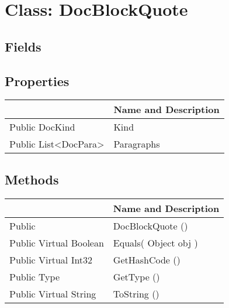 \documentclass[11pt, oneside, a4paper]{book}
\begin{document}
\hypertarget{SoftwareEngineeringTools.{}Documentation.{}DocBlockQuote}{}
\section{Class: DocBlockQuote}

\subsection{Fields}

\subsection{Properties}
\begin{center}
\begin{tabular}{| p{3cm} | p{12cm} | }
\hline
\textbf{ } & \textbf{ Name and Description}\\
\hline
 Public  DocKind &  Kind\hypertarget{SoftwareEngineeringTools.{}Documentation.{}DocBlockQuote.{}Kind}{}\\
\hline
 Public  List<DocPara> &  Paragraphs\hypertarget{SoftwareEngineeringTools.{}Documentation.{}DocBlockQuote.{}Paragraphs}{}\\
\hline
\end{tabular}
\end{center}

\subsection{Methods}
\begin{center}
\begin{tabular}{| p{3cm} | p{12cm} | }
\hline
\textbf{ } & \textbf{ Name and Description}\\
\hline
 Public  &  DocBlockQuote ()\hypertarget{SoftwareEngineeringTools.{}Documentation.{}DocBlockQuote.{}DocBlockQuote}{}\\
\hline
 Public  Virtual  Boolean &  Equals(\hypertarget{SoftwareEngineeringTools.{}Documentation.{}DocBlockQuote.{}Equals\_Object}{} Object  obj  )\\
\hline
 Public  Virtual  Int32 &  GetHashCode ()\hypertarget{SoftwareEngineeringTools.{}Documentation.{}DocBlockQuote.{}GetHashCode}{}\\
\hline
 Public  Type &  GetType ()\hypertarget{SoftwareEngineeringTools.{}Documentation.{}DocBlockQuote.{}GetType}{}\\
\hline
 Public  Virtual  String &  ToString ()\hypertarget{SoftwareEngineeringTools.{}Documentation.{}DocBlockQuote.{}ToString}{}\\
\hline
\end{tabular}
\end{center}
 
\end{document}
